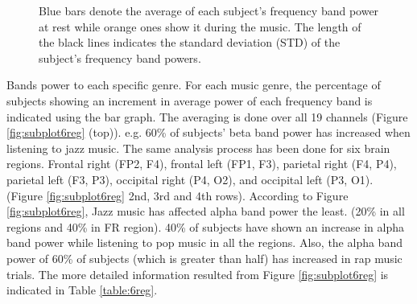 \documentclass[9pt,twocolumn]{paper-template}
\begin{document}
\begin{figure}[!htbp]
\begin{subfigure}[b]{0.4\linewidth}
  \end{subfigure}
  \caption{Blue bars denote the average of each subject’s frequency band power at rest while orange ones show it during the music.
The length of the black lines indicates the standard deviation (STD) of the subject’s frequency band powers.
}
  \label{fig:GenresRT}
\end{figure}

Bands power to each specific genre. For each music genre, the percentage of subjects showing an increment in average power of each frequency band is indicated using the bar graph. The averaging is done over all 19 channels (Figure \ref{fig:subplot6reg} (top)). e.g. 60\% of subjects' beta band power has increased when listening to jazz music. The same analysis process has been done for six brain regions. \cite{kabuto1993} Frontal right (FP2, F4), frontal left (FP1, F3), parietal right (F4, P4), parietal left (F3, P3), occipital right (P4, O2), and occipital left (P3, O1). (Figure \ref{fig:subplot6reg} 2nd, 3rd and 4th rows). According to Figure \ref{fig:subplot6reg}, Jazz music has affected alpha band power the least. (20\% in all regions and 40\% in FR region). 40\% of subjects have shown an increase in alpha band power while listening to pop music in all the regions. Also, the alpha band power of 60\% of subjects (which is greater than half) has increased in rap music trials. The more detailed information resulted from Figure \ref{fig:subplot6reg} is indicated in Table \ref{table:6reg}.\\ 
\end{document}
